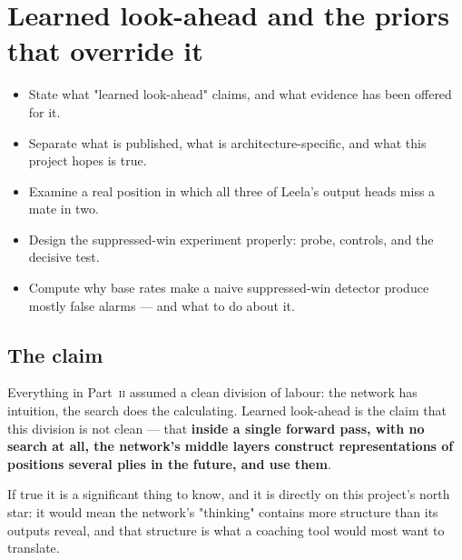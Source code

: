 \chapter{Learned look-ahead and the priors that override it}
\label{ch:lookahead}

\begin{objectives}
\begin{itemize}
\item State what "learned look-ahead" claims, and what evidence has been offered for it.
\item Separate what is published, what is architecture-specific, and what this project hopes
  is true.
\item Examine a real position in which all three of Leela's output heads miss a mate in two.
\item Design the suppressed-win experiment properly: probe, controls, and the decisive test.
\item Compute why base rates make a naive suppressed-win detector produce mostly false alarms
  --- and what to do about it.
\end{itemize}
\end{objectives}

\section{The claim}

Everything in Part~\textsc{ii} assumed a clean division of labour: the network has intuition,
the search does the calculating. Learned look-ahead is the claim that this division is not
clean --- that \textbf{inside a single forward pass, with no search at all, the network's
middle layers construct representations of positions several plies in the future, and use
them}.

If true it is a significant thing to know, and it is directly on this project's north star:
it would mean the network's "thinking" contains more structure than its outputs reveal, and
that structure is what a coaching tool would most want to translate.

